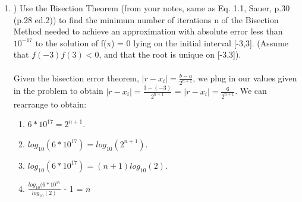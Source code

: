\documentclass[12pt]{article}
\begin{document}
\begin{enumerate}
	 \item ) Use the Bisection Theorem (from your notes, same as Eq. 1.1, Sauer, p.30 (p.28 ed.2)) to find the
minimum number of iterations n of the Bisection Method needed to achieve an approximation
with absolute error less than $10^{-17}$ to the solution of f(x) = 0 lying on the initial interval [-3,3]. (Assume that $f(-3)f(3) < 0$, and that the root is unique on [-3,3]). \\ \\
Given the bisection error theorem, $|r-x_i| = \frac{b-a}{2^{n+1}}$, we plug in our values given in the problem to obtain $|r-x_i| = \frac{3-(-3)}{2^{n+1}}$ =  $|r-x_i| = \frac{6}{2^{n+1}}$. We can rearrange to obtain:
	\begin{enumerate}
		\item[] $6*10^{17} = 2^{n+1}$.
		\item[] $log_{10}(6*10^{17}) = log_{10}(2^{n+1})$.
		\item[] $log_{10}(6*10^{17}) = (n+1)log_{10}(2)$.
		\item[] $\frac{log_{10}(6*10^{17}}{log_{10}(2)}$ - 1 = $n$		
	\end{enumerate}
	 \pagebreak
	

\end{enumerate}
\end{document}
